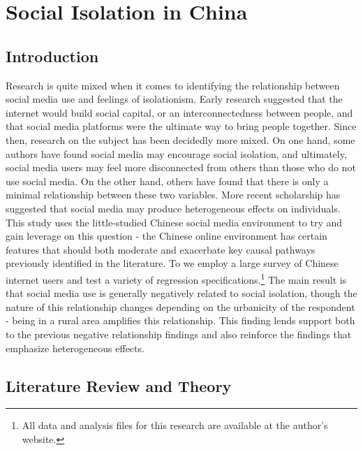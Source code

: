 \documentclass[]{interact}
\theoremstyle{plain}%
\theoremstyle{definition}
\theoremstyle{remark}
\begin{document}
\newpage{}

\hypertarget{social-isolation-in-china}{%
\section{Social Isolation in China}\label{social-isolation-in-china}}

\hypertarget{introduction}{%
\subsection{Introduction}\label{introduction}}

Research is quite mixed when it comes to identifying the relationship
between social media use and feelings of isolationism. Early research
suggested that the internet would build social capital, or an
interconnectedness between people, and that social media platforms were
the ultimate way to bring people together. Since then, research on the
subject has been decidedly more mixed. On one hand, some authors have
found social media may encourage social isolation, and ultimately,
social media users may feel more disconnected from others than those who
do not use social media. On the other hand, others have found that there
is only a minimal relationship between these two variables. More recent
scholarship has suggested that social media may produce heterogeneous
effects on individuals. This study uses the little-studied Chinese
social media environment to try and gain leverage on this question - the
Chinese online environment has certain features that should both
moderate and exacerbate key causal pathways previously identified in the
literature. To we employ a large survey of Chinese internet users and
test a variety of regression specifications.\footnote{All data and
  analysis files for this research are available at the author's
  website.} The main result is that social media use is generally
negatively related to social isolation, though the nature of this
relationship changes depending on the urbanicity of the respondent -
being in a rural area amplifies this relationship. This finding lends
support both to the previous negative relationship findings and also
reinforce the findings that emphasize heterogeneous effects.

\hypertarget{literature-review-and-theory}{%
\subsection{Literature Review and
Theory}\label{literature-review-and-theory}}
\end{document}
